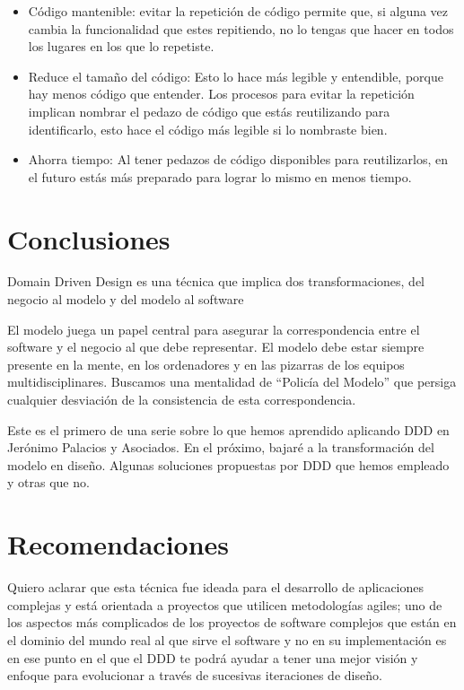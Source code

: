 \documentclass{article}
\begin{document}
\begin{itemize}
 \item Código mantenible: evitar la repetición de código permite que, si alguna vez cambia la funcionalidad que estes repitiendo, no lo tengas que hacer en todos los lugares en los que lo repetiste. 

 \item Reduce el tamaño del código: Esto lo hace más legible y entendible, porque hay menos código que entender. Los procesos para evitar la repetición implican nombrar el pedazo de código que estás reutilizando para identificarlo, esto hace el código más legible si lo nombraste bien. 

 \item Ahorra tiempo: Al tener pedazos de código disponibles para reutilizarlos, en el futuro estás más preparado para lograr lo mismo en menos tiempo. 
\end{itemize} 
\section{Conclusiones}

Domain Driven Design es una técnica que implica dos transformaciones, del negocio al modelo y del modelo al software 
 
El modelo juega un papel central para asegurar la correspondencia entre el software y el negocio al que debe representar. El modelo debe estar siempre presente en la mente, en los ordenadores y en las pizarras de los equipos multidisciplinares. Buscamos una mentalidad de “Policía del Modelo” que persiga cualquier desviación de la consistencia de esta correspondencia.  

Este es el primero de una serie sobre lo que hemos aprendido aplicando DDD en Jerónimo Palacios y Asociados. En el próximo, bajaré a la transformación del modelo en diseño. Algunas soluciones propuestas por DDD que hemos empleado y otras que no. 

\section{Recomendaciones}

Quiero aclarar que esta técnica fue ideada para el desarrollo de aplicaciones complejas y está orientada a proyectos que utilicen metodologías agiles; uno de los aspectos más complicados de los proyectos de software complejos que están en el dominio del mundo real al que sirve el software y no en su implementación es en ese punto en el que el DDD te podrá ayudar a tener una mejor visión y enfoque para evolucionar a través de sucesivas iteraciones de diseño. 
\end{document}
